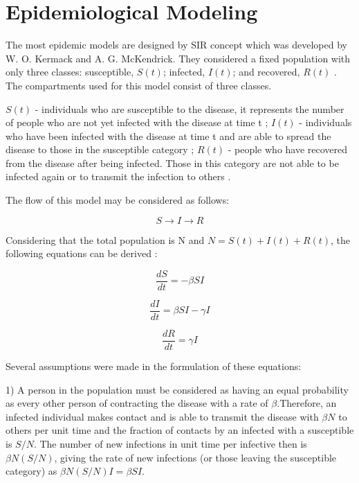 \chapter*{Epidemiological Modeling}


The most epidemic models are designed by SIR concept which was developed by W. O. Kermack and A. G. McKendrick. They considered a fixed population with only three classes: susceptible, $S(t)$; infected, $I(t)$; and recovered, $R(t)$ \cite{per14}. The compartments used for this model consist of three classes.

$S(t)$ - individuals who are susceptible to the disease, it represents the number of people who are not yet infected with the disease at time t \cite{per14};
$I(t)$ - individuals who have been infected with the disease at time t and are able to spread the disease to those in the susceptible category \cite{per14};
$R(t)$ - people who have recovered from the disease after being infected. Those in this category are not able to be infected again or to transmit the infection to others \cite{per14}.

The flow of this model may be considered as follows:

\begin{equation}
S \rightarrow I \rightarrow R
\end{equation}

Considering that the total population is N and $N = S(t) + I(t) + R(t)$, the following equations can be derived \cite{per15}:

\begin{equation}
\frac{dS}{dt} = -\beta S I
\end{equation}

\begin{equation}
\frac{dI}{dt} = \beta S I - \gamma I
\end{equation}

\begin{equation}
\frac{dR}{dt} = \gamma I
\end{equation}

Several assumptions were made in the formulation of these equations:

1) A person in the population must be considered as having an equal probability as every other person of contracting the disease with a rate of  $\beta$.Therefore, an infected individual makes contact and is able to transmit the disease with $\beta N$ to others per unit time and the fraction of contacts by an infected with a susceptible is $S/N$. The number of new infections in unit time per infective then is $\beta N (S/N)$, giving the rate of new infections (or those leaving the susceptible category) as $\beta N (S/N) I = \beta S I$. \cite{per14}

